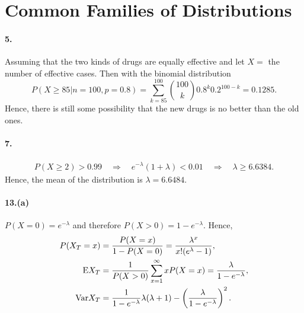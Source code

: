 \section{Common Families of Distributions}
\paragraph{5.}
\begin{solution}
  Assuming that the two kinds of drugs are equally effective and let 
  $X = $ the number of effective cases. Then with the binomial distribution
  \[
    P(X\ge 85|n=100,p=0.8) 
    = \sum_{k=85}^{100}\binom{100}{k}0.8^k0.2^{100-k}
    = 0.1285.
  \]
  Hence, there is still some possibility that the new drugs is no better than
  the old ones.
\end{solution}

\paragraph{7.}
\begin{solution}
  \begin{align*}
    P(X\ge 2) > 0.99
    \quad\Rightarrow\quad
    e^{-\lambda}(1+\lambda) < 0.01
    \quad\Rightarrow\quad
    \lambda \ge 6.6384.
  \end{align*}
  Hence, the mean of the distribution is $\lambda = 6.6484$.
\end{solution}

\paragraph{13.(a)}
\begin{solution}
  $P(X=0)=e^{-\lambda}$ and therefore $P(X>0) = 1-e^{-\lambda}$. Hence,
  \begin{align*}
    P(X_T=x) &= \frac{P(X=x)}{1-P(X=0)} = \frac{\lambda^x}{x!(e^\lambda-1)}, \\
    \mathrm{E} X_T &= \frac{1}{P(X>0)}\sum_{x=1}^\infty xP(X=x) 
            = \frac{\lambda}{1-e^{-\lambda}}, \\
    \mathrm{Var} X_T &= \frac{1}{1-e^{-\lambda}} \lambda(\lambda+1) - 
                \left(\frac{\lambda}{1-e^{-\lambda}}\right)^2.
  \end{align*}
\end{solution}


